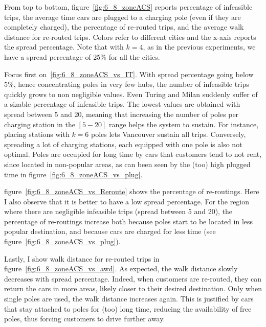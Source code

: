 From top to bottom, figure~\ref{fig:6_8_zoneACS} reports percentage of infeasible trips, the average time cars are plugged to a charging pole (even if they are completely charged), the percentage of re-routed trips,  and the average walk distance for re-routed trips. 
Colors refer to different cities and the x-axis reports the spread percentage. 
Note that with $k=4$, as in the previous experiments, we have a spread percentage of 25\% for all the cities.


Focus first on~\ref{fig:6_8_zoneACS_vs_IT}. With spread percentage going below 5\%, hence concentrating poles in very few hubs, the number of infeasible trips quickly grows to non negligible values. Even Turing and Milan suddenly suffer of a sizable percentage of infeasible trips.
The lowest values are obtained with spread between 5 and 20, meaning that increasing the number of poles per charging station in the $[5-20]$ range helps the system to sustain.
For instance, placing stations with $k=6$ poles lets Vancouver sustain all trips. 
Conversely, spreading a lot of charging stations, each equipped with one pole is also not optimal. Poles are occupied for long time by cars that customers tend to not rent, since located in non-popular areas, as can been seen by the (too) high plugged time in figure~\ref{fig:6_8_zoneACS_vs_plug}.


figure~\ref{fig:6_8_zoneACS_vs_Reroute} shows the percentage of re-routings. Here I also observe that it is better to have a low spread percentage.
For the region where there are negligible infeasible trips (spread between 5 and 20), the percentage of re-routings increase both because poles start to be located in less popular destination, and because cars are charged for less time (see figure~\ref{fig:6_8_zoneACS_vs_plug}).

Lastly, I show walk distance for re-routed trips in figure~\ref{fig:6_8_zoneACS_vs_awd}. As expected, the walk distance slowly decreases with spread percentage. Indeed, when customers are re-routed, they can return the cars in more areas, likely closer to their desired destination. Only when single poles are used, the walk distance increases again. This is justified by cars that stay attached to poles for (too) long time, reducing the availability of free poles, thus forcing customers to drive further away.

